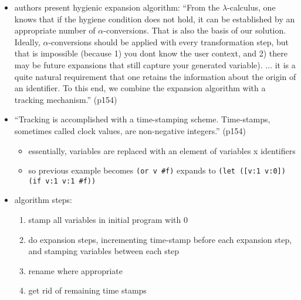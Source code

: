 \documentclass[12pt]{article}	%
\begin{document}
\begin{itemize}
	\item authors present hygienic expansion algorithm: ``From the $\lambda$-calculus, one knows that if the hygiene condition does not hold, it can be established by an appropriate number of $\alpha$-conversions. That is also the basis of our solution. Ideally, $\alpha$-conversions should be applied with every transformation step, but that is impossible (because 1) you dont know the user context, and 2) there may be future expansions that still capture your generated variable). $\ldots$ it is a quite natural requirement that one retains the information about the origin of an identifier. To this end, we combine the expansion algorithm with a tracking mechanism.'' (p154)
	
	\item ``Tracking is accomplished with a time-stamping scheme. Time-stamps, sometimes called clock values, are non-negative integers.'' (p154)
		\begin{itemize}
			\item essentially, variables are replaced with an element of variables x identifiers
			\item so previous example becomes \verb!(or v #f)! expands to \verb!(let ([v:1 v:0]) (if v:1 v:1 #f))!
		\end{itemize}
		
	\item algorithm steps:
		\begin{enumerate}
				\item stamp all variables in initial program with 0
				\item do expansion steps, incrementing time-stamp before each expansion step, and stamping variables between each step
				\item rename where appropriate
				\item get rid of remaining time stamps
			\end{enumerate}

		
\end{itemize}

\cite{Kohlbecker1986Hygienic,Kohlbecker1987Macrobyexample,Bawden1988Syntactic,Clinger1991Macros,Dybvig1992Syntactic,Dybvig1992Writing,Flatt2002Composable,Culpepper2004Taming,Herman2008Theory,Culpepper2010Fortifying}


\end{document}
